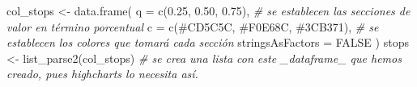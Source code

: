 \documentclass[
]{book}
\newenvironment{Shaded}{\begin{snugshade}}{\end{snugshade}}
\newcommand{\AttributeTok}[1]{\textcolor[rgb]{0.77,0.63,0.00}{#1}}
\newcommand{\CommentTok}[1]{\textcolor[rgb]{0.56,0.35,0.01}{\textit{#1}}}
\newcommand{\ConstantTok}[1]{\textcolor[rgb]{0.00,0.00,0.00}{#1}}
\newcommand{\FloatTok}[1]{\textcolor[rgb]{0.00,0.00,0.81}{#1}}
\newcommand{\FunctionTok}[1]{\textcolor[rgb]{0.00,0.00,0.00}{#1}}
\newcommand{\NormalTok}[1]{#1}
\newcommand{\OtherTok}[1]{\textcolor[rgb]{0.56,0.35,0.01}{#1}}
\newcommand{\StringTok}[1]{\textcolor[rgb]{0.31,0.60,0.02}{#1}}
\begin{document}
\begin{Shaded}
\begin{Highlighting}[]
\NormalTok{col\_stops }\OtherTok{\textless{}{-}}
  \FunctionTok{data.frame}\NormalTok{(}
    \AttributeTok{q =} \FunctionTok{c}\NormalTok{(}\FloatTok{0.25}\NormalTok{, }\FloatTok{0.50}\NormalTok{, }\FloatTok{0.75}\NormalTok{), }\CommentTok{\# se establecen las secciones de valor en término porcentual}
    \AttributeTok{c =} \FunctionTok{c}\NormalTok{(}\StringTok{\textquotesingle{}\#CD5C5C\textquotesingle{}}\NormalTok{, }\StringTok{\textquotesingle{}\#F0E68C\textquotesingle{}}\NormalTok{, }\StringTok{\textquotesingle{}\#3CB371\textquotesingle{}}\NormalTok{), }\CommentTok{\# se establecen los colores que tomará cada sección}
    \AttributeTok{stringsAsFactors =} \ConstantTok{FALSE}
\NormalTok{  )}
\NormalTok{stops }\OtherTok{\textless{}{-}} \FunctionTok{list\_parse2}\NormalTok{(col\_stops) }\CommentTok{\# se crea una lista con este \_dataframe\_ que hemos creado, pues highcharts lo necesita así.}


\end{Highlighting}
\end{Shaded}
\end{document}
